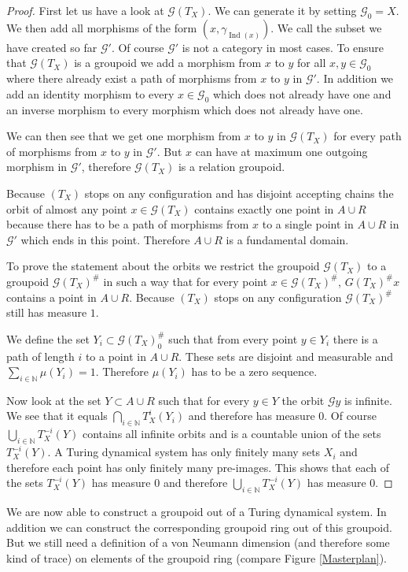 \documentclass[12pt,a4paper]{scrartcl}
\theoremstyle{plain}
\theoremstyle{definition}
\numberwithin{equation}{section}
\newcommand{\N}{\mathbb{N}} %
\newcommand{\2}{\mathbb{Z} / 2 \mathbb{Z}}
\newcommand{\G}{\mathcal{G}}
\newcommand{\1}{\bar{1}}
\newcommand{\0}{\bar{0}}
\newcommand{\Ind}{\operatorname{Ind}}
\begin{document}
\begin{proof}
	First let us have a look at $\G (T_X)$. We can generate it by setting $\G_0 = X$. We then add all morphisms of the form $(x, \gamma_{\Ind(x)})$. We call the subset we have created so far $\G'$. Of course $\G'$ is not a category in most cases. To ensure that $\G (T_X)$ is a groupoid we add a morphism from $x$ to $y$ for all $x, y \in \G_0$ where there already exist a path of morphisms from $x$ to $y$ in $\G'$. In addition we add an identity morphism to every $ x\in \G_0$ which does not already have one and an inverse morphism to every morphism which does not already have one. 
	
	We can then see that we get one morphism from $x$ to $y$ in $\G (T_X)$ for every path of morphisms from $x$ to $y$ in $\G'$. But $x$ can have at maximum one outgoing morphism in $\G'$, therefore $\G (T_X)$ is a relation groupoid.

	Because $(T_X)$ stops on any configuration and has disjoint accepting chains the orbit of almost any point $x \in \G (T_X)$ contains exactly one point in $A \cup R$ because there has to be a path of morphisms from $x$ to a single point in $A \cup R$ in $\G'$ which ends in this point. Therefore $A \cup R$ is a fundamental domain.
	
	To prove the statement about the orbits we restrict the groupoid $\G (T_X)$ to a groupoid $\G (T_X)^\#$ in such a way that for every point $x \in \G (T_X)^\#$, $G (T_X)^\# x$ contains a point in $A \cup R$. Because $(T_X)$ stops on any configuration $\G (T_X)^\#$ still has measure $1$.
	
	We define the set $Y_i \subset \G (T_X)_0^\#$ such that from every point $y \in Y_i$ there is a path of length $i$ to a point in $A \cup R$. These sets are disjoint and measurable and $\sum_{i \in \N} \mu(Y_i) = 1$. Therefore $\mu(Y_i)$ has to be a zero sequence.
	
	Now look at the set $Y \subset A \cup R$ such that for every $y \in Y$ the orbit $\G y$ is infinite. We see that it equals $\bigcap_{i \in \N} T_X^i(Y_i)$ and therefore has measure $0$. Of course $\bigcup_{i \in \N }T_X^{-i}(Y)$ contains all infinite orbits and  is a countable union of the sets $T_X^{-i}(Y)$. A Turing dynamical system has only finitely many sets $X_i$ and therefore each point has only finitely many pre-images. This shows that each of the sets $T_X^{-i}(Y)$ has measure $0$ and therefore $\bigcup_{i \in \N }T_X^{-i}(Y)$ has measure $0$.
\end{proof}
We are now able to construct a groupoid out of a Turing dynamical system. In addition we can construct the corresponding groupoid ring out of this groupoid. But we still need a definition of a von Neumann dimension (and therefore some kind of trace) on elements of the groupoid ring (compare Figure \ref{Masterplan}).
\end{document}

